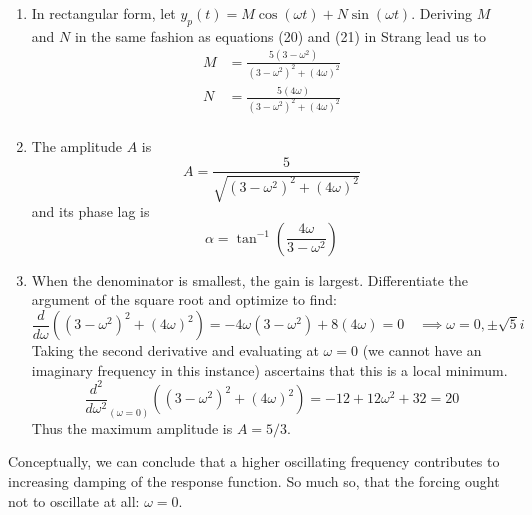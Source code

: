 \documentclass[a4paper]{article}
\begin{document}
\begin{enumerate}[label=(\alph*)]
	\item In rectangular form, let \( y_{p } \!\left( t  \right) = M \cos\!\left( \omega t \right) + N \sin\!\left( \omega t \right) \). Deriving \( M  \) and \( N  \) in the same fashion as equations (20) and (21) in Strang lead us to
	\begin{align*}
		M  & = \frac{5 \!\left( 3 - \omega^{2} \right)}{\!\left( 3 - \omega^{2} \right)^{2} + \!\left( 4 \omega  \right)^{2}} \\[12pt]
		N  & = \frac{5 \!\left( 4 \omega  \right)}{\!\left( 3 - \omega^{2} \right)^{2} + \!\left( 4 \omega  \right)^{2}} \\ 
	\end{align*}
	\item The amplitude \( A  \) is
	\[
		A = \frac{5}{\sqrt{\!\left( 3 - \omega^{2} \right)^{2} + \!\left( 4 \omega  \right)^{2}}} 
	\]
	and its phase lag is
	\[
		\alpha = \tan^{-1}\!\left( \frac{4 \omega }{3 - \omega^{2}} \right)
	\]
	\item When the denominator is smallest, the gain is largest. Differentiate the argument of the square root and optimize to find:
	\[
		\frac{d }{d \omega } \!\left( \!\left( 3 - \omega^{2} \right)^{2} + \!\left( 4 \omega \right)^{2} \right) = -4 \omega \!\left( 3 - \omega^{2} \right) + 8 \!\left( 4 \omega \right) = 0 \quad \implies \omega = 0, \pm \sqrt{5}i
	\]
	Taking the second derivative and evaluating at \( \omega = 0 \) (we cannot have an imaginary frequency in this instance) ascertains that this is a local minimum.
	\[
		\frac{d^{2}}{d \omega^{2}}_{\!\left( \omega = 0 \right)} \!\left( \!\left( 3 - \omega^{2} \right)^{2} + \!\left( 4 \omega  \right)^{2} \right) = -12 + 12 \omega^{2} + 32 = 20
	\]
	Thus the maximum amplitude is \( A = 5/3 \). 
\end{enumerate}
Conceptually, we can conclude that a higher oscillating frequency contributes to increasing damping of the response function. So much so, that the forcing ought not to oscillate at all: \( \omega = 0 \).

\vspace{12pt}

\end{document}
